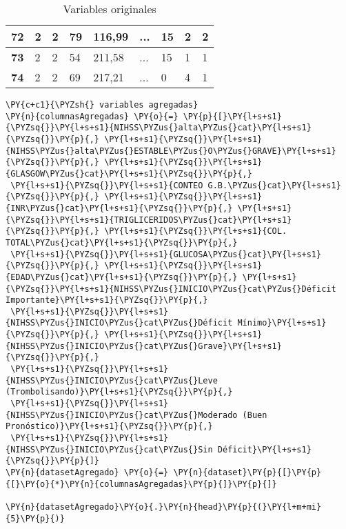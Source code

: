 \begin{table}[H]
{\begin{tabular}{|c|l|l|l|l|l|l|l|l|}
\textbf{72} & 2 & 2 & 79 & 116,99 & ... & 15 & 2 & 2 \\ \hline
\textbf{73} & 2 & 2 & 54 & 211,58 & ... & 15 & 1 & 1 \\ \hline
\textbf{74} & 2 & 2 & 69 & 217,21 & ... & 0 & 4 & 1 \\ \hline
\end{tabular}%
}
\caption{Variables originales}
\label{tab:Variables originales}
\end{table}
        
    \begin{tcolorbox}[breakable, size=fbox, boxrule=1pt, pad at break*=1mm,colback=cellbackground, colframe=cellborder]
\begin{Verbatim}[commandchars=\\\{\}]
\PY{c+c1}{\PYZsh{} variables agregadas}
\PY{n}{columnasAgregadas} \PY{o}{=} \PY{p}{[}\PY{l+s+s1}{\PYZsq{}}\PY{l+s+s1}{NIHSS\PYZus{}alta\PYZus{}cat}\PY{l+s+s1}{\PYZsq{}}\PY{p}{,} \PY{l+s+s1}{\PYZsq{}}\PY{l+s+s1}{NIHSS\PYZus{}alta\PYZus{}ESTABLE\PYZus{}O\PYZus{}GRAVE}\PY{l+s+s1}{\PYZsq{}}\PY{p}{,} \PY{l+s+s1}{\PYZsq{}}\PY{l+s+s1}{GLASGOW\PYZus{}cat}\PY{l+s+s1}{\PYZsq{}}\PY{p}{,}
 \PY{l+s+s1}{\PYZsq{}}\PY{l+s+s1}{CONTEO G.B.\PYZus{}cat}\PY{l+s+s1}{\PYZsq{}}\PY{p}{,} \PY{l+s+s1}{\PYZsq{}}\PY{l+s+s1}{INR\PYZus{}cat}\PY{l+s+s1}{\PYZsq{}}\PY{p}{,} \PY{l+s+s1}{\PYZsq{}}\PY{l+s+s1}{TRIGLICERIDOS\PYZus{}cat}\PY{l+s+s1}{\PYZsq{}}\PY{p}{,} \PY{l+s+s1}{\PYZsq{}}\PY{l+s+s1}{COL. TOTAL\PYZus{}cat}\PY{l+s+s1}{\PYZsq{}}\PY{p}{,}
 \PY{l+s+s1}{\PYZsq{}}\PY{l+s+s1}{GLUCOSA\PYZus{}cat}\PY{l+s+s1}{\PYZsq{}}\PY{p}{,} \PY{l+s+s1}{\PYZsq{}}\PY{l+s+s1}{EDAD\PYZus{}cat}\PY{l+s+s1}{\PYZsq{}}\PY{p}{,} \PY{l+s+s1}{\PYZsq{}}\PY{l+s+s1}{NIHSS\PYZus{}INICIO\PYZus{}cat\PYZus{}Déficit Importante}\PY{l+s+s1}{\PYZsq{}}\PY{p}{,}
 \PY{l+s+s1}{\PYZsq{}}\PY{l+s+s1}{NIHSS\PYZus{}INICIO\PYZus{}cat\PYZus{}Déficit Mínimo}\PY{l+s+s1}{\PYZsq{}}\PY{p}{,} \PY{l+s+s1}{\PYZsq{}}\PY{l+s+s1}{NIHSS\PYZus{}INICIO\PYZus{}cat\PYZus{}Grave}\PY{l+s+s1}{\PYZsq{}}\PY{p}{,}
 \PY{l+s+s1}{\PYZsq{}}\PY{l+s+s1}{NIHSS\PYZus{}INICIO\PYZus{}cat\PYZus{}Leve (Trombolisando)}\PY{l+s+s1}{\PYZsq{}}\PY{p}{,}
 \PY{l+s+s1}{\PYZsq{}}\PY{l+s+s1}{NIHSS\PYZus{}INICIO\PYZus{}cat\PYZus{}Moderado (Buen Pronóstico)}\PY{l+s+s1}{\PYZsq{}}\PY{p}{,}
 \PY{l+s+s1}{\PYZsq{}}\PY{l+s+s1}{NIHSS\PYZus{}INICIO\PYZus{}cat\PYZus{}Sin Déficit}\PY{l+s+s1}{\PYZsq{}}\PY{p}{]}
\PY{n}{datasetAgregado} \PY{o}{=} \PY{n}{dataset}\PY{p}{[}\PY{p}{[}\PY{o}{*}\PY{n}{columnasAgregadas}\PY{p}{]}\PY{p}{]}

\PY{n}{datasetAgregado}\PY{o}{.}\PY{n}{head}\PY{p}{(}\PY{l+m+mi}{5}\PY{p}{)}
\end{Verbatim}
\end{tcolorbox}

